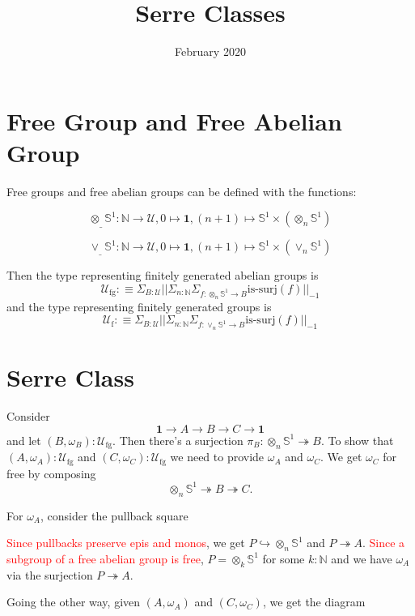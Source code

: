 \documentclass{article}
\title{Serre Classes}
\date{February 2020}
\newcommand{\n}{\mathbb{N}}
\newcommand{\Univ}{\mathcal{U}}
\newcommand{\Univfg}{\mathcal{U}_{\textrm{fg}}}
\newcommand{\Univf}{\mathcal{U}_{\textrm{f}}}
\newcommand{\0}{\mathbf{0}}
\newcommand{\1}{\mathbf{1}}
\newcommand{\defequiv}{: \equiv}
\newcommand{\inj}{\hookrightarrow}
\newcommand{\surj}{\twoheadrightarrow}
\newcommand{\sone}{\mathbb{S}^1}
\begin{document}
\maketitle

\section{Free Group and Free Abelian Group}

Free groups and free abelian groups can be defined with the functions:

$$ \otimes_\_ \sone : \n \to \Univ, 0 \mapsto \1, (n+1) \mapsto \sone \times (\otimes_n \sone) $$


$$ \vee_\_ \sone : \n \to \Univ, 0 \mapsto \1, (n+1) \mapsto \sone \times (\vee_n \sone) $$

Then the type representing finitely generated abelian groups is 
$$ \Univfg \defequiv \Sigma_{B : \Univ} || \Sigma_{n : \n} \Sigma_{f : \otimes_n \sone \to B} \textrm{is-surj}(f) ||_{-1} $$
and the type representing finitely generated groups is 
$$ \Univf \defequiv \Sigma_{B : \Univ} || \Sigma_{n : \n} \Sigma_{f : \vee_n \sone \to B} \textrm{is-surj}(f) ||_{-1} $$

\section{Serre Class}
Consider $$ \1 \to A \to B \to C \to \1$$ and let $(B, \omega_B) : \Univfg$. Then there's a surjection $\pi_B : \otimes_n \sone \surj B$. To show that $(A, \omega_A) : \Univfg$ and $(C, \omega_C) : \Univfg$ we need to provide $\omega_A$ and $\omega_C$. We get $\omega_C$ for free by composing $$ \otimes_n \sone \surj B \surj C.$$

For $\omega_A$, consider the pullback square

\begin{center}
\end{center}

\textcolor{red}{Since pullbacks preserve epis and monos}, we get $P \inj \otimes_n \sone$ and $P \surj A$. \textcolor{red}{Since a subgroup of a free abelian group is free}, $P = \otimes_k \sone$ for some $k : \n$ and we have $\omega_A$ via the surjection $P \surj A$.

Going the other way, given $(A, \omega_A)$ and $(C, \omega_C)$, we get the diagram
\end{document}
